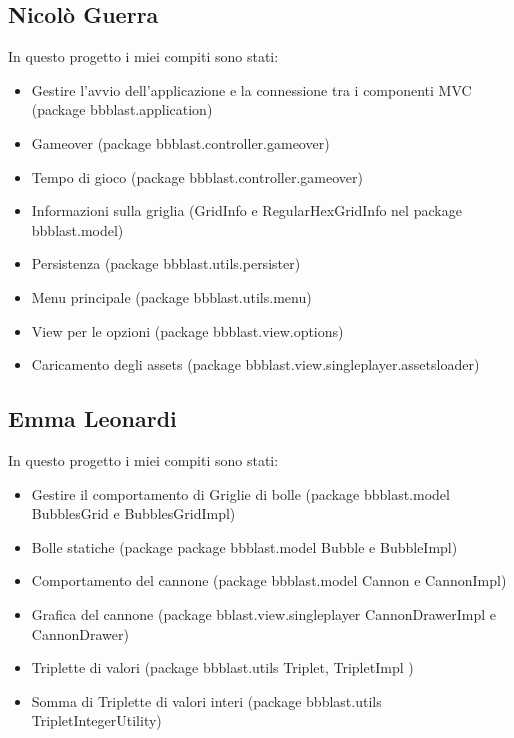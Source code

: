 \documentclass[a4paper,12pt]{report}
\begin{document}
\subsection{Nicolò Guerra}

In questo progetto i miei compiti sono stati:
\begin{itemize}
	\item Gestire l'avvio dell'applicazione e la connessione tra i componenti MVC (package bbblast.application)
	\item Gameover (package bbblast.controller.gameover)
	\item Tempo di gioco (package bbblast.controller.gameover)
	\item Informazioni sulla griglia (GridInfo e RegularHexGridInfo nel package bbblast.model)
	\item Persistenza (package bbblast.utils.persister)
	\item Menu principale (package bbblast.utils.menu)
	\item View per le opzioni (package bbblast.view.options)
	\item Caricamento degli assets (package bbblast.view.singleplayer.assetsloader)
\end{itemize}

\subsection{Emma Leonardi}

In questo progetto i miei compiti sono stati:
\begin{itemize}
	\item Gestire il comportamento di Griglie di bolle (package bbblast.model BubblesGrid e BubblesGridImpl)
	\item Bolle statiche (package package bbblast.model Bubble e BubbleImpl)
	\item Comportamento del cannone (package bbblast.model Cannon e CannonImpl)
	\item Grafica del cannone (package bblast.view.singleplayer CannonDrawerImpl e CannonDrawer)
	\item Triplette di valori (package bbblast.utils Triplet, TripletImpl )
	\item Somma di Triplette di valori interi (package bbblast.utils TripletIntegerUtility)
\end{itemize}
\end{document}
